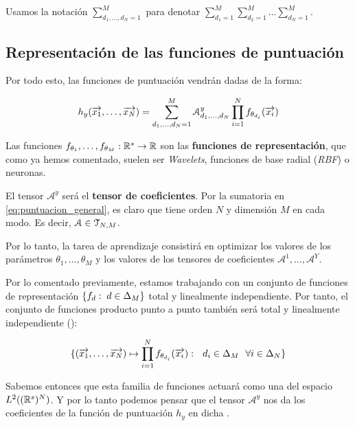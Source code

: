 \begin{observacion}
	Usamos la notación $\sum_{d_1, \ldots, d_N = 1}^{M}$ para denotar $\sum_{d_1 = 1}^{M} \sum_{d_2 = 1}^{M} \ldots \sum_{d_N = 1}^{M}$.
\end{observacion}

\subsection{Representación de las funciones de puntuación} \label{sec:repr_funciones_puntuacion}

Por todo esto, las funciones de puntuación vendrán dadas de la forma:

\begin{equation} \label{eq:puntuacion_general}
	h_y(\overrightarrow{x_1}, \ldots, \overrightarrow{x_N}) = \sum_{d_1, \ldots, d_N = 1}^{M} \mathcal{A}^y_{d_1, \ldots, d_N} \prod_{i = 1}^N f_{\theta_{d_i}}(\overrightarrow{x_i})
\end{equation}

Las funciones $f_{\theta_1}, \ldots, f_{\theta_M}: \mathbb{R}^s \to \mathbb{R}$ son las \textbf{funciones de representación}, que como ya hemos comentado, suelen ser \textit{Wavelets}, funciones de base radial (\textit{RBF}) o neuronas.

El tensor $\mathcal{A}^y$ será el \textbf{tensor de coeficientes}. Por la sumatoria en \eqref{eq:puntuacion_general}, es claro que tiene orden $N$ y dimensión $M$ en cada modo. Es decir, $\mathcal{A} \in \mathcal{T}_{N, M}$.

Por lo tanto, la tarea de aprendizaje consistirá en optimizar los valores de los parámetros $\theta_1, \ldots, \theta_M$ y los valores de los tensores de coeficientes $\mathcal{A}^1, \ldots, \mathcal{A}^Y$.

\begin{observacion}
	Por lo comentado previamente, estamos trabajando con un conjunto de funciones de representación $\{ f_d: \; d \in \Delta_{M} \}$ total y linealmente independiente. Por tanto, el conjunto de funciones producto punto a punto también será total y linealmente independiente ():

	\begin{equation}
		\{ (\overrightarrow{x_1}, \ldots, \overrightarrow{x_N}) \mapsto \prod_{i = 1}^{N} f_{\theta_{d_i}} (\overrightarrow{x_i}): \ \  d_i \in \Delta_{M} \ \  \forall i \in \Delta_{N}  \}
	\end{equation}


	Sabemos entonces que esta familia de funciones actuará como una  del espacio $L^2((\mathbb{R}^s)^N)$. Y por lo tanto podemos pensar que el tensor $\mathcal{A}^y$ nos da los coeficientes de la función de puntuación $h_y$ en dicha .
\end{observacion}

